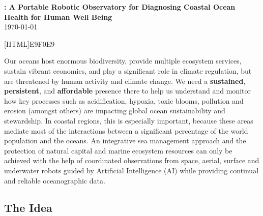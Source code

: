 \documentclass[12pt]{article}
\begin{document}
\vspace*{1cm}
\begin{center}
  {\large \bf{\proe}: A Portable Robotic Observatory for Diagnosing Coastal Ocean Health for Human Well Being}\\
  \today
\end{center}

\vspace*{0.5cm}

[HTML]{E9F0E9}{\parbox{6.0in}{%

    Our oceans host enormous biodiversity, provide multiple ecosystem
    services, sustain vibrant economies, and play a significant role
    in climate regulation, but are threatened by human activity and
    climate change.
    We need a \textbf{sustained}, \textbf{persistent}, and
    \textbf{affordable} presence there to help us understand and
    monitor how key processes such as acidification, hypoxia, toxic
    blooms, pollution and erosion (amongst others) are impacting
    global ocean sustainability and
    stewardship. %
    In coastal regions, this is especially important, because these
    areas mediate most of the interactions between a significant
    percentage of the world population and the oceans. An integrative
    sea management approach and the protection of natural capital and
    marine ecosystem resources can only be achieved with the help of
    coordinated observations from space, aerial, surface and
    underwater robots guided by Artificial Intelligence (AI) while
    providing continual and reliable oceanographic data.}}

\subsection{The Idea}

\end{document}
